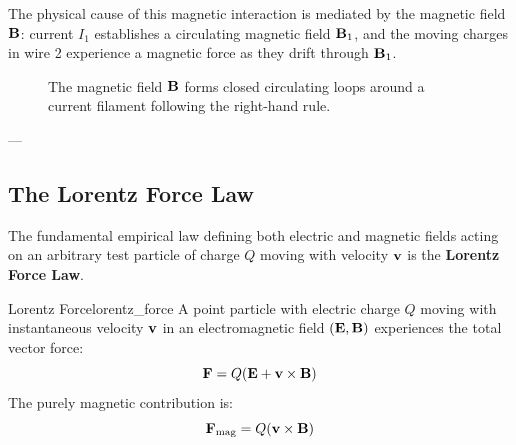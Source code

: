 The physical cause of this magnetic interaction is mediated by the magnetic field $\vb{B}$: current $I_1$ establishes a circulating magnetic field $\vb{B}_1$, and the moving charges in wire 2 experience a magnetic force as they drift through $\vb{B}_1$.

\begin{figure}[htbp]
    \centering
    \caption{The magnetic field $\vb{B}$ forms closed circulating loops around a current filament following the right-hand rule.}
    \label{fig:curling_b_field}
\end{figure}

---

\subsection{The Lorentz Force Law}
\label{sec:lorentz_force}

The fundamental empirical law defining both electric and magnetic fields acting on an arbitrary test particle of charge $Q$ moving with velocity $\vb{v}$ is the \textbf{Lorentz Force Law}.

\begin{definition}{Lorentz Force}{lorentz_force}
A point particle with electric charge $Q$ moving with instantaneous velocity $\vb{v}$ in an electromagnetic field $(\vb{E}, \vb{B})$ experiences the total vector force:
\begin{equation}
    \vb{F} = Q\qty(\vb{E} + \vb{v} \times \vb{B})
    \label{eq:lorentz_law}
\end{equation}
The purely magnetic contribution is:
\begin{equation}
    \vb{F}_{\mathrm{mag}} = Q\qty(\vb{v} \times \vb{B})
    \label{eq:magnetic_force}
\end{equation}
\end{definition}

